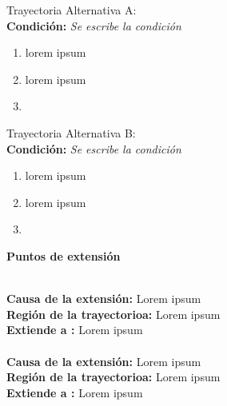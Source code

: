 \normalsize{Trayectoria Alternativa A:}\\\footnotesize{}
\textbf{Condición:} \textit{Se escribe la condición}

\begin{enumerate}[{A-}1.]
	\item \actor lorem ipsum
	\item \sistema lorem ipsum
	\item \finTA	

\end{enumerate}


\normalsize{Trayectoria Alternativa B:}\\
\footnotesize{} 
\textbf{Condición:} \textit{Se escribe la condición}

\begin{enumerate}[{B-}1.]
	\item \actor lorem ipsum
	\item \sistema lorem ipsum
	\item \finTA	

\end{enumerate}



\Large{\textbf{Puntos de extensión}}\\\\\footnotesize{}

\textbf{Causa de la extensión:} Lorem ipsum\\
\textbf{Región de la trayectorioa:} Lorem ipsum\\
\textbf{Extiende a :} Lorem ipsum\\\\

\textbf{Causa de la extensión:} Lorem ipsum\\
\textbf{Región de la trayectorioa:} Lorem ipsum\\
\textbf{Extiende a :} Lorem ipsum\\

